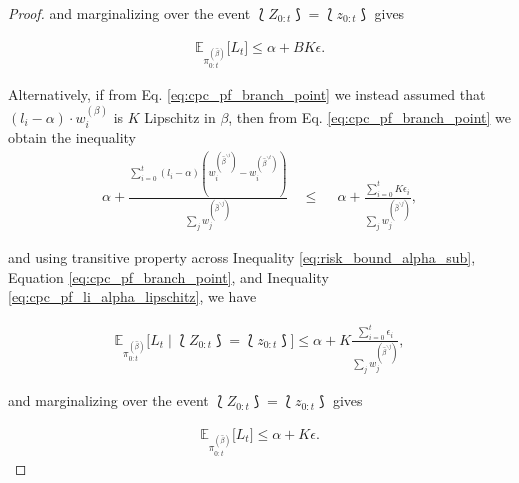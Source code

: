 \begin{proof}
and marginalizing over the event $\lbag Z_{0:t} \rbag = \lbag z_{0:t} \rbag$ gives 

\begin{align}\label{cpc_pf_result_1}
    \mathbb{E}_{\pi_{0:t}^{(\hat\beta)}}\big[L_{t} \big] \leq \alpha + BK\epsilon.
\end{align}


Alternatively, if from Eq. \eqref{eq:cpc_pf_branch_point} we instead assumed that $(l_i - \alpha) \cdot w_i^{(\beta)}$ is $K$ Lipschitz in $\beta$, then from Eq. \eqref{eq:cpc_pf_branch_point} we obtain the inequality
\begin{align}\label{eq:cpc_pf_li_alpha_lipschitz}
    \alpha + \frac{\sum_{i=0}^{t}(l_i - \alpha)(w_i^{(\hat\beta^{\backslash i})} -  w_i^{(\hat\beta^{\backslash t})})}{\sum_{j}w_j^{(\hat\beta^{\backslash j})}} \quad \leq \quad  \ \alpha + \frac{\sum_{i=0}^{t}K\epsilon_i}{\sum_{j}w_j^{(\hat\beta^{\backslash j})}},
\end{align}

and using transitive property across Inequality \eqref{eq:risk_bound_alpha_sub}, Equation \eqref{eq:cpc_pf_branch_point}, and Inequality \eqref{eq:cpc_pf_li_alpha_lipschitz}, we have

\begin{align*}
    \mathbb{E}_{\pi_{0:t}^{(\hat\beta)}}\Big[L_{t} \mid \lbag Z_{0:t} \rbag = \lbag z_{0:t} \rbag\Big] \leq \alpha + K\frac{\sum_{i=0}^{t}\epsilon_i}{\sum_{j}w_j^{(\hat\beta^{\backslash j})}},
\end{align*}

and marginalizing over the event $\lbag Z_{0:t} \rbag = \lbag z_{0:t} \rbag$ gives 

\begin{align}\label{cpc_pf_result_2}
    \mathbb{E}_{\pi_{0:t}^{(\hat\beta)}}\big[L_{t} \big] \leq \alpha + K\epsilon.
\end{align}





\end{proof}
